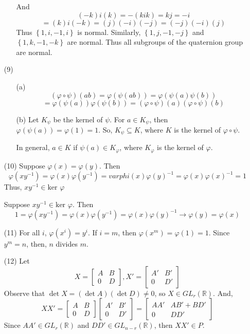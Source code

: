 \documentclass[12pt]{article}
\begin{document}
\begin{itemize}
\begin{itemize}
And
$$(-k)i(k) = -(kik) = kj = -i$$
$$= (k)i(-k) = (j)(-i)(-j) = (-j)(-i)(j)$$
Thus $\left\lbrace 1, i, -1, i \right\rbrace$ is normal. Similarly, $\left\lbrace 1, j, -1, -j \right\rbrace$ and $\left\lbrace 1, k , -1, -k \right\rbrace$ are normal. Thus all subgroups of the quaternion group are normal.
\end{itemize}
\item[(9)]
\begin{itemize}
\item[(a)]
$$(\varphi \circ \psi)(ab) = \varphi(\psi(ab)) = \varphi(\psi(a)\psi(b))$$
$$= \varphi(\psi(a))\varphi(\psi(b)) = (\varphi \circ \psi)(a)(\varphi \circ \psi)(b)$$
\item[(b)]
Let $K_\psi$ be the kernel of $\psi$. For $a \in K_\psi$, then $\varphi(\psi(a)) = \varphi(1) = 1$. So, $K_\psi \subseteq K$, where $K$ is the kernel of $\varphi \circ \psi$. 

In general, $a \in K$ if $\psi(a) \in K_\varphi$, where $K_\varphi$ is the kernel of $\varphi$. 
\end{itemize}
\item[(10)]
Suppose $\varphi(x) = \varphi(y)$. Then 
$$\varphi(xy^{-1}) = \varphi(x)\varphi(y^{-1}) = varphi(x)\varphi(y)^{-1} = \varphi(x)\varphi(x)^{-1} = 1$$
Thus, $xy^{-1} \in \text{ker }\varphi$

Suppose $xy^{-1} \in \text{ker }\varphi$. Then
$$1 = \varphi(xy^{-1}) = \varphi(x)\varphi(y^{-1}) = \varphi(x)\varphi(y)^{-1} \rightarrow \varphi(y) = \varphi(x)$$
\item[(11)]
For all $i$, $\varphi(x^i) = y^i$. If $i = m$, then $\varphi(x^m) = \varphi(1) = 1$. Since $y^m = n$, then, $n$ divides $m$.
\item[(12)]
Let
$$X = \begin{bmatrix}
A & B \\
0 & D
\end{bmatrix}, X' = \begin{bmatrix}
A' & B' \\
0 & D'
\end{bmatrix}$$
Observe that $\det X = (\det A)(\det D) \neq 0$, so $X \in GL_r(\mathbb{R})$. And,
$$XX' = \begin{bmatrix}
A & B \\
0 & D
\end{bmatrix}\begin{bmatrix}
A' & B' \\
0 & D'
\end{bmatrix} = \begin{bmatrix}
AA' & AB' + BD' \\
0 & DD'
\end{bmatrix}$$
Since $AA' \in GL_r(\mathbb{R})$ and $DD' \in GL_{n-r}(\mathbb{R})$, then $XX' \in P$.


\end{itemize}
\end{document}
